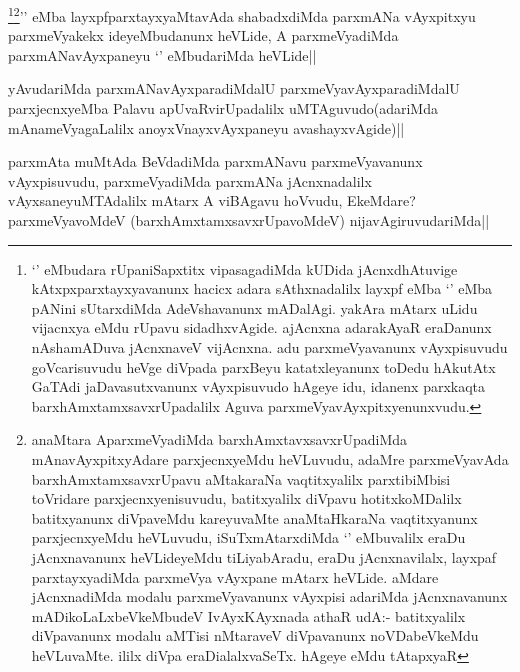 \begin{artha}
\footnote{`\stext' eMbudara rUpaniSapxtitx vipasagadiMda kUDida jAcnxdhAtuvige kAtxpxparxtayxyavanunx hacicx adara sAthxnadalilx layxpf eMba `\stext' eMba pANini sUtarxdiMda AdeVshavanunx mADalAgi. yakAra mAtarx uLidu vijacnxya eMdu rUpavu sidadhxvAgide. ajAcnxna adarakAyaR eraDanunx nAshamADuva jAcnxnaveV vijAcnxna. adu parxmeVyavanunx vAyxpisuvudu goVcarisuvudu heVge diVpada parxBeyu katatxleyanunx toDedu hAkutAtx GaTAdi jaDavasutxvanunx vAyxpisuvudo hAgeye idu, idanenx parxkaqta barxhAmxtamxsavxrUpadalilx Aguva parxmeVyavAyxpitxyenunxvudu.}\footnote{anaMtara AparxmeVyadiMda barxhAmxtavxsavxrUpadiMda mAnavAyxpitxyAdare parxjecnxyeMdu heVLuvudu, adaMre parxmeVyavAda barxhAmxtamxsavxrUpavu aMtakaraNa vaqtitxyalilx parxtibiMbisi  toVridare parxjecnxyenisuvudu, batitxyalilx diVpavu hotitxkoMDalilx batitxyanunx diVpaveMdu kareyuvaMte anaMtaHkaraNa vaqtitxyanunx parxjecnxyeMdu heVLuvudu, iSuTxmAtarxdiMda `\stext' eMbuvalilx eraDu jAcnxnavanunx heVLideyeMdu tiLiyabAradu, eraDu jAcnxnavilalx, layxpaf parxtayxyadiMda parxmeVya vAyxpane mAtarx heVLide. aMdare jAcnxnadiMda modalu parxmeVyavanunx vAyxpisi adariMda jAcnxnavanunx mADikoLaLxbeVkeMbudeV IvAyxKAyxnada athaR udA:- batitxyalilx diVpavanunx modalu aMTisi nMtaraveV diVpavanunx noVDabeVkeMdu heVLuvaMte. ililx diVpa eraDialalxvaSeTx. hAgeye eMdu tAtapxyaR }'\stext' eMba layxpfparxtayxyaMtavAda shabadxdiMda parxmANa vAyxpitxyu parxmeVyakekx ideyeMbudanunx heVLide, A parxmeVyadiMda parxmANavAyxpaneyu `\stext' eMbudariMda heVLide||
\end{artha}


\begin{artha}
yAvudariMda parxmANavAyxparadiMdalU parxmeVyavAyxparadiMdalU parxjecnxyeMba Palavu apUvaRvirUpadalilx uMTAguvudo(adariMda mAnameVyagaLalilx anoyxVnayxvAyxpaneyu avashayxvAgide)||
\end{artha}



\begin{artha}
parxmAta muMtAda BeVdadiMda parxmANavu parxmeVyavanunx vAyxpisuvudu, parxmeVyadiMda parxmANa jAcnxnadalilx vAyxsaneyuMTAdalilx mAtarx A viBAgavu hoVvudu, EkeMdare? parxmeVyavoMdeV (barxhAmxtamxsavxrUpavoMdeV) nijavAgiruvudariMda||
\end{artha}

